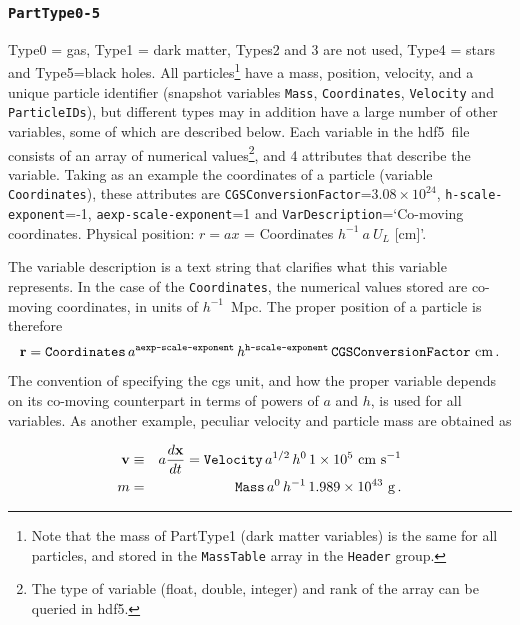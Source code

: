 \documentclass[10pt, a4paper]{article}
\newcommand{\hdf}{{\sc hdf5}}
\begin{document}
\subsubsection{\texttt{PartType0-5}}
\label{sect:part}
Type0 = gas, Type1 = dark matter, Types2 and 3 are not used, Type4 = stars and
Type5=black holes. All particles\footnote{Note that the mass of PartType1 (dark
matter variables) is the same for all particles, and stored in the
\texttt{MassTable} array in the \texttt{Header} group.} have a mass, position,
velocity, and a unique particle identifier (snapshot variables \texttt{Mass},
\texttt{Coordinates}, \texttt{Velocity} and \texttt{ParticleIDs}), but
different types may in addition have a large number of other variables, some of
which are described below. Each variable in the \hdf\ file consists of an array
of numerical values\footnote{The type of variable (float, double, integer) and
rank of the array can be queried in \hdf.}, and 4 attributes that describe the
variable.  Taking as an example the coordinates of a particle (variable
\texttt{Coordinates}), these attributes are
\texttt{CGSConversionFactor}=$3.08\times 10^{24}$,
\texttt{h-scale-exponent}=-1, \texttt{aexp-scale-exponent}=1 and
\texttt{VarDescription}=\lq Co-moving coordinates. Physical position: $r =
ax$ = Coordinates $h^{-1}~a~U_L$ [cm]\rq. 

The variable description is a text string that clarifies what this variable
represents. In the case of the \texttt{Coordinates}, the numerical values
stored are co-moving coordinates, in units of $h^{-1}$~Mpc. The proper position
of a particle is therefore \begin{equation} {\bf r} =
\texttt{Coordinates}\,a^\texttt{aexp-scale-exponent}\,h^\texttt{h-scale-exponent}\,\texttt{CGSConversionFactor}~{\rm
cm}\,.  \label{eq:coordinates} \end{equation} The convention of specifying the
cgs unit, and how the proper variable depends on its co-moving counterpart in
terms of powers of $a$ and $h$, is used for all variables. As another example,
peculiar velocity and particle mass are obtained as

\begin{eqnarray}
{\bf v}&\equiv& a{d{\bf x}\over dt} = \texttt{Velocity}\,a^{1/2}\,h^0\,1\times 10^5~{\rm cm~s}^{-1}\nonumber\\
m &=& \texttt{Mass}\,a^0\,h^{-1}\,1.989\times 10^{43}~{\rm g}\,.	
\end{eqnarray}
\end{document}
